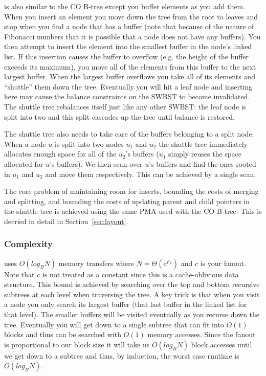 \documentclass{style}
\begin{document}
\Insert{} is also similar to the CO B-tree except you buffer elements as you
add them. When you insert an element you move down the tree from the root to
leaves and stop when you find a node that has a buffer (note that because of
the nature of Fibonacci numbers that it is possible that a node does not have
any buffers). You then attempt to insert the element into the smallest buffer
in the node's linked list. If this insertion causes the buffer to overflow
(e.g. the height of the buffer exceeds its maximum), you move all of the
elements from this buffer to the next largest buffer. When the largest buffer
overflows you take all of its elements and ``shuttle'' them down the tree.
Eventually you will hit a leaf node and inserting here may cause the balance
constraints on the SWBST to become invalidated. The shuttle tree rebalances
itself just like any other SWBST: the leaf node is split into two and this
split cascades up the tree until balance is restored.

The shuttle tree also needs to take care of the buffers belonging to a split
node. When a node $u$ is split into two nodes $u_1$ and $u_2$ the shuttle tree
immediately allocates enough space for all of the $u_2$'s buffers ($u_1$
simply reuses the space allocated for $u$'s buffers). We then scan over $u$'s
buffers and find the ones rooted in $u_1$ and $u_2$ and move them
respectively. This can be achieved by a single scan.

The core problem of maintaining room for inserts, bounding the costs of
merging and splitting, and bounding the costs of updating parent and child
pointers in the shuttle tree is achieved using the same PMA used with the CO
B-tree. This is decried in detail in Section~\ref{sec:layout}.

\subsubsection{Complexity}

\Search{} uses $O(log_B N)$ memory transfers where $N = \Theta(c^{F_k})$ and
$c$ is your fanout. Note that $c$ is not treated as a constant since this is a
cache-oblivious data structure. This bound is achieved by searching over the
top and bottom recursive subtrees at each level when traversing the tree. A
key trick is that when you visit a node you only search its largest buffer
(that last buffer in the linked list for that level). The smaller buffers will
be visited eventually as you recurse down the tree. Eventually you will get
down to a single subtree that can fit into $O(1)$ blocks and thus can be
searched with $O(1)$ memory accesses. Since the fanout is proportional to our
block size it will take us $O(log_B N)$ block accesses until we get down to a
subtree and thus, by induction, the worst case runtime is $O(log_B N)$.
\end{document}
